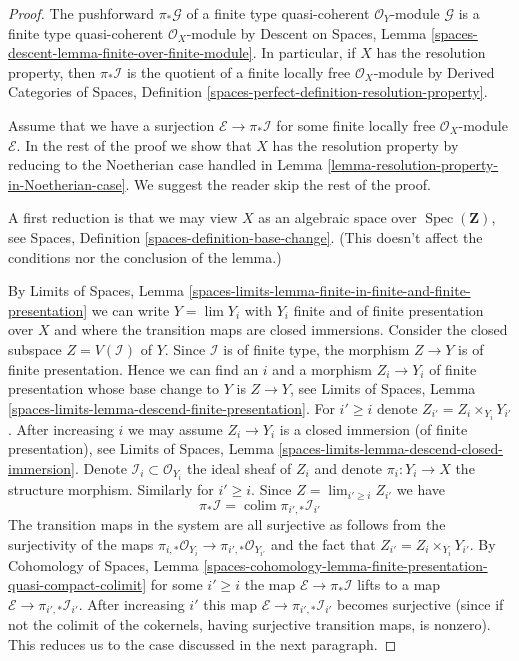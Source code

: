 \documentclass[10pt,a4paper]{amsart}
\theoremstyle{plain}
\theoremstyle{definition}
\theoremstyle{remark}
\numberwithin{equation}{subsection}
\def\lim{\mathop{\mathrm{lim}}\nolimits}
\def\colim{\mathop{\mathrm{colim}}\nolimits}
\def\Spec{\mathop{\mathrm{Spec}}}
\begin{document}
\begin{proof}
The pushforward $\pi_*\mathcal{G}$ of a finite type
quasi-coherent $\mathcal{O}_Y$-module $\mathcal{G}$ is a finite
type quasi-coherent $\mathcal{O}_X$-module by
Descent on Spaces, Lemma
\ref{spaces-descent-lemma-finite-over-finite-module}.
In particular, if $X$ has the resolution property, then $\pi_*\mathcal{I}$
is the quotient of a finite locally free $\mathcal{O}_X$-module by
Derived Categories of Spaces, Definition
\ref{spaces-perfect-definition-resolution-property}.

\medskip\noindent
Assume that we have a surjection $\mathcal{E} \to \pi_*\mathcal{I}$
for some finite locally free $\mathcal{O}_X$-module $\mathcal{E}$.
In the rest of the proof we show that $X$ has the resolution property
by reducing to the Noetherian case handled in
Lemma \ref{lemma-resolution-property-in-Noetherian-case}.
We suggest the reader skip the rest of the proof.

\medskip\noindent
A first reduction is that we may view $X$ as an algebraic space over
$\Spec(\mathbf{Z})$, see
Spaces, Definition \ref{spaces-definition-base-change}.
(This doesn't affect the conditions nor the conclusion of the lemma.)

\medskip\noindent
By Limits of Spaces, Lemma
\ref{spaces-limits-lemma-finite-in-finite-and-finite-presentation}
we can write $Y = \lim Y_i$ with $Y_i$ finite and of finite
presentation over $X$ and where the transition maps are closed
immersions. Consider the closed subspace $Z = V(\mathcal{I})$ of $Y$.
Since $\mathcal{I}$ is of finite type, the morphism $Z \to Y$ is of
finite presentation. Hence we can find an $i$ and a morphism
$Z_i \to Y_i$ of finite presentation whose base change to $Y$
is $Z \to Y$, see Limits of Spaces, Lemma
\ref{spaces-limits-lemma-descend-finite-presentation}.
For $i' \geq i$ denote $Z_{i'} = Z_i \times_{Y_i} Y_{i'}$.
After increasing $i$ we may assume $Z_i \to Y_i$ is a
closed immersion (of finite presentation), see Limits of Spaces, Lemma
\ref{spaces-limits-lemma-descend-closed-immersion}. Denote
$\mathcal{I}_i \subset \mathcal{O}_{Y_i}$ the ideal
sheaf of $Z_i$ and denote $\pi_i : Y_i \to X$ the structure morphism.
Similarly for $i' \geq i$. Since $Z = \lim_{i' \geq i} Z_{i'}$ we have
$$
\pi_*\mathcal{I} = \colim \pi_{i', *}\mathcal{I}_{i'}
$$
The transition maps in the system are all surjective
as follows from the surjectivity of the maps
$\pi_{i, *}\mathcal{O}_{Y_i} \to \pi_{i', *}\mathcal{O}_{Y_{i'}}$
and the fact that $Z_{i'} = Z_i \times_{Y_i} Y_{i'}$.
By Cohomology of Spaces, Lemma
\ref{spaces-cohomology-lemma-finite-presentation-quasi-compact-colimit}
for some $i' \geq i$ the map $\mathcal{E} \to \pi_*\mathcal{I}$
lifts to a map $\mathcal{E} \to \pi_{i', *}\mathcal{I}_{i'}$.
After increasing $i'$ this map
$\mathcal{E} \to \pi_{i', *}\mathcal{I}_{i'}$
becomes surjective (since if not the colimit of the cokernels,
having surjective transition maps, is nonzero).
This reduces us to the case discussed in the next paragraph.


\end{proof}
\end{document}
